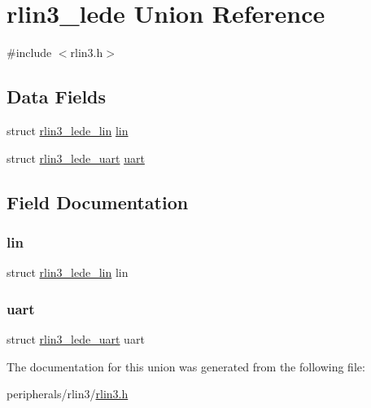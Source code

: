 \hypertarget{unionrlin3__lede}{}\section{rlin3\+\_\+lede Union Reference}
\label{unionrlin3__lede}


{\ttfamily \#include $<$rlin3.\+h$>$}

\subsection*{Data Fields}
\begin{DoxyCompactItemize}
\item 
struct \mbox{\hyperlink{structrlin3__lede__lin}{rlin3\+\_\+lede\+\_\+lin}} \mbox{\hyperlink{unionrlin3__lede_a3464d53dce25eb94ccb4b64466b6caf7}{lin}}
\item 
struct \mbox{\hyperlink{structrlin3__lede__uart}{rlin3\+\_\+lede\+\_\+uart}} \mbox{\hyperlink{unionrlin3__lede_a0e5af3f2f5157b7ba754a557ba571e0f}{uart}}
\end{DoxyCompactItemize}


\subsection{Field Documentation}
\mbox{\label{unionrlin3__lede_a3464d53dce25eb94ccb4b64466b6caf7}} 
\subsubsection{\texorpdfstring{lin}{lin}}
{\footnotesize\ttfamily struct \mbox{\hyperlink{structrlin3__lede__lin}{rlin3\+\_\+lede\+\_\+lin}} lin}

\mbox{\label{unionrlin3__lede_a0e5af3f2f5157b7ba754a557ba571e0f}} 
\subsubsection{\texorpdfstring{uart}{uart}}
{\footnotesize\ttfamily struct \mbox{\hyperlink{structrlin3__lede__uart}{rlin3\+\_\+lede\+\_\+uart}} uart}



The documentation for this union was generated from the following file\+:\begin{DoxyCompactItemize}
\item 
peripherals/rlin3/\mbox{\hyperlink{rlin3_8h}{rlin3.\+h}}\end{DoxyCompactItemize}
